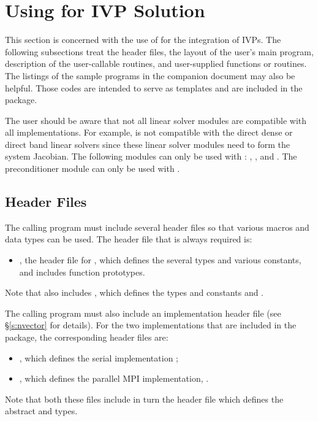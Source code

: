 \chapter{Using {\cvodes} for IVP Solution}\label{c:simulation}

This section is concerned with the use of {\cvodes} for the integration of IVPs.
The following subsections treat the header files, the layout of the user's main
program, description of the {\cvodes} user-callable routines, and user-supplied functions 
or routines. 
The listings of the sample programs in the companion document \cite{} may also be helpful. 
Those codes are intended to serve as templates and are included in the {\cvodes} package.

The user should be aware that not all linear solver modules are compatible 
with all {\nvector} implementations. 
For example, {\nvecp} is not compatible with the direct dense or direct band 
linear solvers since these linear solver modules need to form the system Jacobian.
The following {\cvodes} modules can only be used with {\nvecs}:
{\cvdense}, {\cvband}, and {\cvbandpre}. The preconditioner module {\cvbbdpre}
can only be used with {\nvecp}. 

\section{Header Files}\label{s:header_sim}

The calling program must include several header files so that various macros
and data types can be used. The header file that is always required is:
%
\begin{itemize}
\item  {}, 
  the header file for {\cvodes}, which defines the several
  types and various constants, and includes function prototypes.
\end{itemize}
%
Note that  also includes , 
which defines the types 
and constants  and .

The calling program must also include an {\nvector} implementation header file
(see \S\ref{s:nvector} for details).
For the two {\nvector} implementations that are included in the {\cvodes} package,
the corresponding header files are:
%
\begin{itemize}
\item {}, 
  which defines the serial implementation {\nvecs};
\item {}, 
  which defines the parallel MPI implementation, {\nvecp}.
\end{itemize}
%
Note that both these files include in turn the header file  which 
defines the abstract  and  types. 

